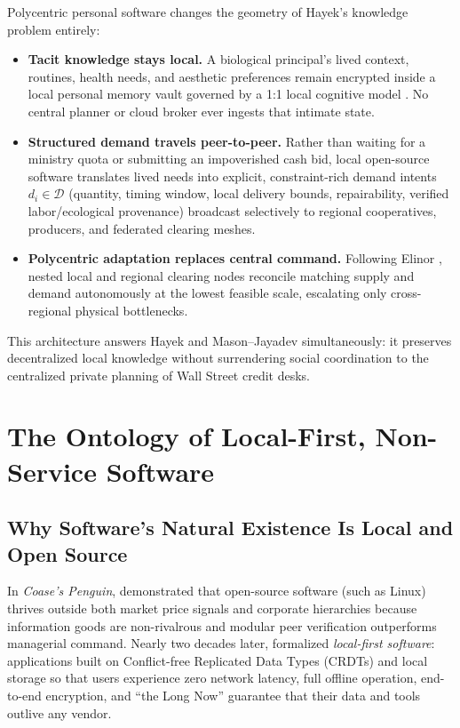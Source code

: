 \documentclass[11pt]{article}
\begin{document}
Polycentric personal software changes the geometry of Hayek's knowledge problem entirely:
\begin{itemize}
  \item \textbf{Tacit knowledge stays local.} A biological principal's lived context, routines, health needs, and aesthetic preferences remain encrypted inside a local personal memory vault governed by a 1:1 local cognitive model \citep{baker2026cin}. No central planner or cloud broker ever ingests that intimate state.
  \item \textbf{Structured demand travels peer-to-peer.} Rather than waiting for a ministry quota or submitting an impoverished cash bid, local open-source software translates lived needs into explicit, constraint-rich demand intents $d_i \in \mathcal{D}$ (quantity, timing window, local delivery bounds, repairability, verified labor/ecological provenance) broadcast selectively to regional cooperatives, producers, and federated clearing meshes.
  \item \textbf{Polycentric adaptation replaces central command.} Following Elinor \citet{ostrom1990governing, ostrom2010beyond}, nested local and regional clearing nodes reconcile matching supply and demand autonomously at the lowest feasible scale, escalating only cross-regional physical bottlenecks.
\end{itemize}

This architecture answers Hayek and Mason--Jayadev simultaneously: it preserves decentralized local knowledge without surrendering social coordination to the centralized private planning of Wall Street credit desks.

\section{The Ontology of Local-First, Non-Service Software}\label{sec:software}

\subsection{Why Software's Natural Existence Is Local and Open Source}

In \emph{Coase's Penguin}, \citet{benkler2002coase} demonstrated that open-source software (such as Linux) thrives outside both market price signals and corporate hierarchies because information goods are non-rivalrous and modular peer verification outperforms managerial command. Nearly two decades later, \citet{kleppmann2019local} formalized \emph{local-first software}: applications built on Conflict-free Replicated Data Types (CRDTs) and local storage so that users experience zero network latency, full offline operation, end-to-end encryption, and ``the Long Now'' guarantee that their data and tools outlive any vendor.
\end{document}

